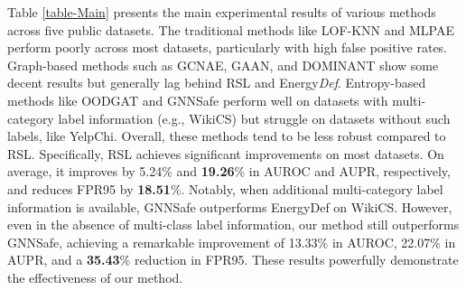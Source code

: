 
Table \ref{table-Main} presents the main experimental results of various methods across five public datasets.
The traditional methods like {LOF-KNN} and {MLPAE} perform poorly across most datasets, particularly with high false positive rates. Graph-based methods such as {GCNAE}, {GAAN}, and {DOMINANT} show some decent results but generally lag behind {RSL} and {Energy\textit{Def}}. Entropy-based methods like {OODGAT} and {GNNSafe} perform well on datasets with multi-category label information (e.g., WikiCS) but struggle on datasets without such labels, like {YelpChi}. Overall, these methods tend to be less robust compared to {RSL}.  Specifically, RSL achieves significant improvements on most datasets. On average, it improves by 5.24\% and \textbf{19.26}\% in AUROC and AUPR, respectively, and reduces FPR95 by \textbf{18.51}\%. Notably, when additional multi-category label information is available, GNNSafe outperforms EnergyDef on WikiCS. However, even in the absence of multi-class label information, our method still outperforms GNNSafe, achieving a remarkable improvement of 13.33\% in AUROC, 22.07\% in AUPR, and a \textbf{35.43}\% reduction in FPR95. These results powerfully demonstrate the effectiveness of our method.








